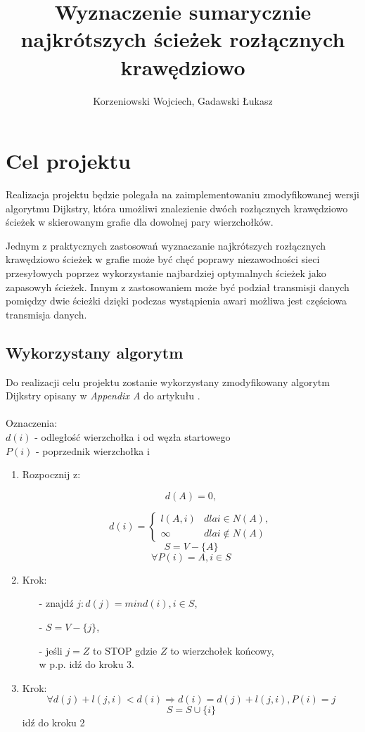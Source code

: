 \documentclass[10pt,a4paper]{article}
\author{Korzeniowski Wojciech, Gadawski Łukasz}
\title{Wyznaczenie sumarycznie najkrótszych ścieżek rozłącznych krawędziowo}
\begin{document}
\maketitle

\section{Cel projektu}
Realizacja projektu będzie polegała na zaimplementowaniu zmodyfikowanej wersji algorytmu Dijkstry, która umożliwi znalezienie dwóch rozłącznych krawędziowo ścieżek w skierowanym grafie dla dowolnej pary wierzchołków.

Jednym z praktycznych zastosowań wyznaczanie najkrótszych rozłącznych krawędziowo ścieżek w grafie może być chęć poprawy niezawodności sieci przesyłowych poprzez wykorzystanie najbardziej optymalnych ścieżek jako zapasowyh ścieżek. Innym z zastosowaniem może być podział transmisji danych pomiędzy dwie ścieżki dzięki podczas wystąpienia awari możliwa jest częściowa transmisja danych.

\subsection{Wykorzystany algorytm}
Do realizacji celu projektu zostanie wykorzystany zmodyfikowany algorytm Dijkstry opisany w \textit{Appendix A} do artykułu \cite{telecom}. \\ \\
Oznaczenia:\\
$d(i)$ - odległość wierzchołka i od węzła startowego \\
$P(i)$ - poprzednik wierzchołka i
\begin{enumerate}
\item Rozpocznij z:

$$
d(A) = 0, 
$$

\[d(i) = \left\{
  \begin{array}{lr}
    l(A, i) & dla i \in N(A),\\
    \infty & dla i \notin N(A)
  \end{array}
\right.
\]
$$
S = V - \{A\}
$$
$$
\forall P(i) = A, i \in S
$$

\item Krok:

\begin{itemize}
\item[-] znajdź $j : d(j) = min d(i), i \in S$,
\item[-] $S = V - \{j\}$,
\item[-] jeśli $j = Z$ to STOP gdzie $Z$ to wierzchołek końcowy,\\
 w p.p. idź do kroku 3.
\end{itemize}

\item Krok:
$$
\forall d(j) + l(j, i) < d(i) \Rightarrow d(i) = d(j) + l(j, i), P(i) = j
$$
$$
S = S \cup \{i\}
$$
idź do kroku 2

\end{enumerate}
\end{document}
